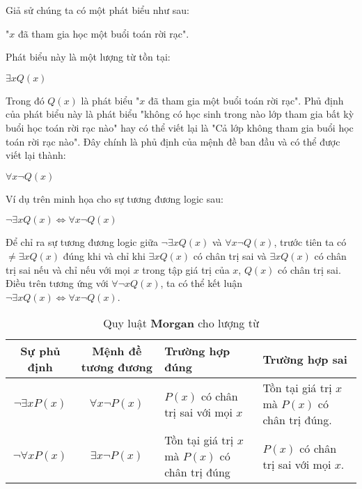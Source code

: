 \documentclass{standalone} %
\begin{document}
        Giả sử chúng ta có một phát biểu như sau:
        \begin{center}
            "$x$ đã tham gia học một buổi toán rời rạc".
        \end{center}
        Phát biểu này là một lượng từ tồn tại:
        \begin{center}
            $\exists x Q(x)$
        \end{center}
        Trong đó $Q(x)$ là phát biểu "$x$ đã tham gia một buổi toán rời rạc". Phủ định của phát biểu này là phát biểu "không có học sinh trong nào lớp tham gia bất kỳ buổi học toán rời rạc nào" hay có thể viết lại là "Cả lớp không tham gia buổi học toán rời rạc nào". Đây chính là phủ định của mệnh đề ban đầu và có thể được viết lại thành:
        \begin{center}
            $\forall x \neg Q(x)$
        \end{center}
        Ví dụ trên minh họa cho sự tương đương logic sau:
        \begin{theorem}
            \begin{center}
                $\neg \exists x Q(x) \Leftrightarrow \forall x \neg Q(x)$
            \end{center}
        \end{theorem}
        
        Để chỉ ra sự tương đương logic giữa $\neg \exists x Q(x)$ và $\forall x \neg Q(x)$, trước tiên ta có $\neq \exists x Q(x)$ đúng khi và chỉ khi $\exists x Q(x)$ có chân trị sai và $\exists x Q(x)$ có chân trị sai nếu và chỉ nếu với mọi $x$ trong tập giá trị của $x$, $Q(x)$ có chân trị sai. Điều trên tương ứng với $\forall \neg x Q(x)$, ta có thể kết luận $\neg \exists x Q(x) \Leftrightarrow \forall x \neg Q(x)$.
        
        \begin{table}[h!]
            \centering
            \setlength{\tabcolsep}{12pt}
            \begin{tabular}{c| c| l| l}
                Sự phủ định & Mệnh đề tương đương & Trường hợp đúng & Trường hợp sai\\
                \hline
                $\neg \exists x P(x)$ & $\forall x \neg P(x)$ & \makecell[l]{$P(x)$ có chân trị sai\\ với mọi $x$} & \makecell[l]{Tồn tại giá trị $x$ mà\\ $P(x)$ có chân trị đúng}.\\ \hline
                $\neg \forall x P(x)$ & $\exists x \neg P(x)$ & \makecell[l]{Tồn tại giá trị $x$ mà\\ $P(x)$ có chân trị đúng} & \makecell[l]{$P(x)$ có chân trị sai\\ với mọi $x$}.
            \end{tabular}
            \caption{Quy luật \textbf{Morgan} cho lượng từ}
        \end{table}
        
\end{document}
